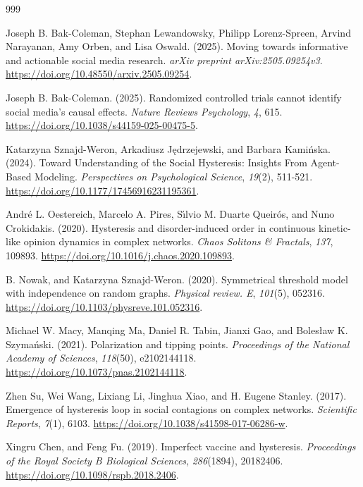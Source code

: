\documentclass[10pt,a4paper]{article}
\begin{document}
\begin{thebibliography}{999}

Joseph B. Bak-Coleman, Stephan Lewandowsky, Philipp Lorenz-Spreen, Arvind Narayanan, Amy Orben, and Lisa Oswald. (2025). Moving towards informative and actionable social media research. \textit{arXiv preprint arXiv:2505.09254v3}. \url{https://doi.org/10.48550/arxiv.2505.09254}.

Joseph B. Bak-Coleman. (2025). Randomized controlled trials cannot identify social media's causal effects. \textit{Nature Reviews Psychology}, \textit{4}, 615. \url{https://doi.org/10.1038/s44159-025-00475-5}.

Katarzyna Sznajd-Weron, Arkadiusz J\k{e}drzejewski, and Barbara Kami\'{n}ska. (2024). Toward Understanding of the Social Hysteresis: Insights From Agent-Based Modeling. \textit{Perspectives on Psychological Science}, \textit{19}(2), 511-521. \url{https://doi.org/10.1177/17456916231195361}.

Andr\'{e} L. Oestereich, Marcelo A. Pires, S\'{\i}lvio M. Duarte Queir\'{o}s, and Nuno Crokidakis. (2020). Hysteresis and disorder-induced order in continuous kinetic-like opinion dynamics in complex networks. \textit{Chaos Solitons \& Fractals}, \textit{137}, 109893. \url{https://doi.org/10.1016/j.chaos.2020.109893}.

B. Nowak, and Katarzyna Sznajd-Weron. (2020). Symmetrical threshold model with independence on random graphs. \textit{Physical review. E}, \textit{101}(5), 052316. \url{https://doi.org/10.1103/physreve.101.052316}.

Michael W. Macy, Manqing Ma, Daniel R. Tabin, Jianxi Gao, and Boles\l{}aw K. Szyma\'{n}ski. (2021). Polarization and tipping points. \textit{Proceedings of the National Academy of Sciences}, \textit{118}(50), e2102144118. \url{https://doi.org/10.1073/pnas.2102144118}.

Zhen Su, Wei Wang, Lixiang Li, Jinghua Xiao, and H. Eugene Stanley. (2017). Emergence of hysteresis loop in social contagions on complex networks. \textit{Scientific Reports}, \textit{7}(1), 6103. \url{https://doi.org/10.1038/s41598-017-06286-w}.

Xingru Chen, and Feng Fu. (2019). Imperfect vaccine and hysteresis. \textit{Proceedings of the Royal Society B Biological Sciences}, \textit{286}(1894), 20182406. \url{https://doi.org/10.1098/rspb.2018.2406}.


\end{thebibliography}
\end{document}
